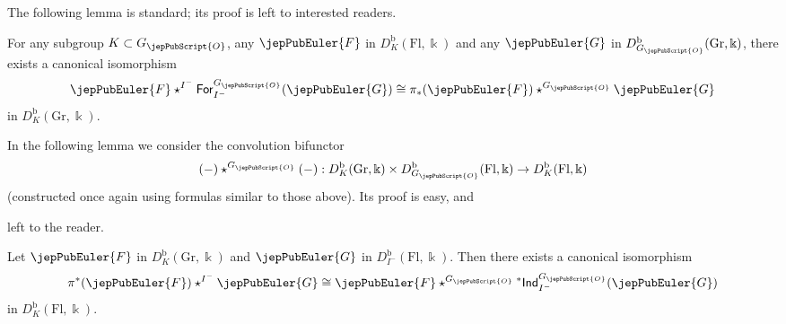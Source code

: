 The following lemma is standard; its proof is left to interested readers.

\begin{lem}
\label{jep104local017}
 For any subgroup $K\subset G_{\jepPubScript{O}}$, any $\jepPubEuler{F}$ in $D^{\mathrm{b}}_K(\mathrm{Fl},\Bbbk)$ and any $\jepPubEuler{G}$ in $D^{\mathrm{b}}_{G_{\jepPubScript{O}}}(\mathrm{Gr},\Bbbk)$, there exists a canonical isomorphism
 \[
  \jepPubEuler{F} \star^{I^-} \mathsf{For}^{G_{\jepPubScript{O}}}_{I^-}(\jepPubEuler{G}) \cong \pi_*(\jepPubEuler{F}) \star^{G_{\jepPubScript{O}}} \jepPubEuler{G}
 \]
 in $D^{\mathrm{b}}_K(\mathrm{Gr},\Bbbk)$.
\end{lem}

In the following lemma we consider the convolution bifunctor
\[
 (-) \star^{G_{\jepPubScript{O}}} (-) : D^{\mathrm{b}}_K(\mathrm{Gr},\Bbbk) \times D^{\mathrm{b}}_{G_{\jepPubScript{O}}}(\mathrm{Fl},\Bbbk) \to D^{\mathrm{b}}_K(\mathrm{Fl},\Bbbk)
\]
(constructed once again using formulas similar to those above). Its proof is easy, and

left to the reader.

\begin{lem}
\label{jep104local019}
 Let $\jepPubEuler{F}$ in $D^{\mathrm{b}}_K(\mathrm{Gr},\Bbbk)$ and $\jepPubEuler{G}$ in $D^{\mathrm{b}}_{I^-}(\mathrm{Fl},\Bbbk)$. Then there exists a canonical isomorphism
 \[
  \pi^*(\jepPubEuler{F}) \star^{I^-} \jepPubEuler{G} \cong \jepPubEuler{F} \star^{G_{\jepPubScript{O}}} {}^{*}\mathsf{Ind}_{I^-}^{G_{\jepPubScript{O}}}(\jepPubEuler{G})
 \]
 in $D^{\mathrm{b}}_K(\mathrm{Fl},\Bbbk)$.
\end{lem}

